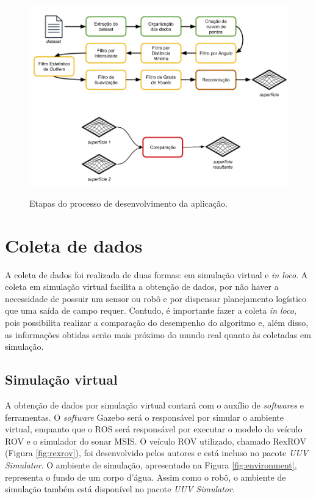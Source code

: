 \begin{figure}[H]
    \centering
    \caption{Etapas do processo de desenvolvimento da aplicação.}
    \includegraphics[scale=0.4]{dados/figuras/etapas.png}
    \label{fig:etapas}
\end{figure}

\section{Coleta de dados}
\label{sec:coleta_dados}

A coleta de dados foi realizada de duas formas: em simulação virtual e \textit{in loco}. 
A coleta em simulação virtual facilita a obtenção de dados, por não haver a necessidade de possuir um sensor ou robô e por dispensar planejamento logístico que uma saída de campo requer. 
Contudo, é importante fazer a coleta \textit{in loco}, pois possibilita realizar a comparação do desempenho do algoritmo e, além disso, as informações obtidas serão mais próximo do mundo real quanto às coletadas em simulação.

\subsection{Simulação virtual}
\label{sec:simulation}

A obtenção de dados por simulação virtual contará com o auxílio de \textit{softwares} e ferramentas. 
O \textit{software} Gazebo será o responsável por simular o ambiente virtual, enquanto que o ROS será responsável por executar o modelo do veículo ROV e o simulador do sonar MSIS.
O veículo ROV utilizado, chamado RexROV (Figura \ref{fig:rexrov}), foi desenvolvido pelos autores \cite{manhaes2016uuv} e está incluso no pacote \textit{UUV Simulator}.
O ambiente de simulação, apresentado na Figura \ref{fig:environment}, representa o fundo de um corpo d'água.
Assim como o robô, o ambiente de simulação também está disponível no pacote \textit{UUV Simulator}.

